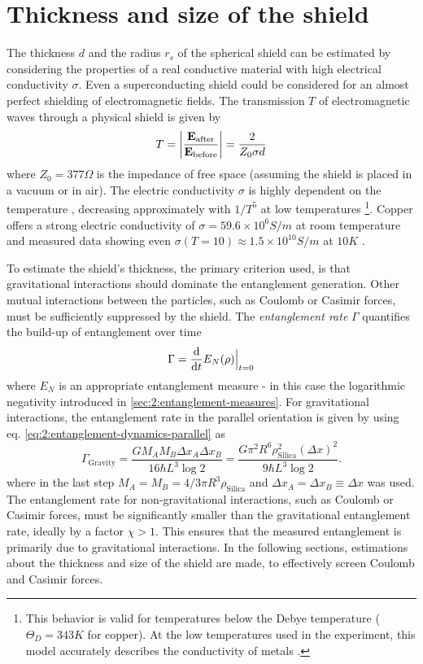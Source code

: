 \section{Thickness and size of the shield}\label{sec:5:shield-size}
The thickness $d$ and the radius $r_s$ of the spherical shield can be estimated by considering the properties of a real conductive material with high electrical conductivity $\sigma$.
Even a superconducting shield could be considered for an almost perfect shielding of electromagnetic fields.
The transmission $T$ of electromagnetic waves through a physical shield is given by \cite{Vandenbosch_2022}
\begin{equation}
  T = \abs{\frac{\vec{E}_\mathrm{after}}{\vec{E}_\mathrm{before}}} = \frac{2}{Z_0 \sigma d}
\end{equation}
where $Z_0 = 377\si{\Omega}$ is the impedance of free space (assuming the shield is placed in a vacuum or in air).
The electric conductivity $\sigma$ is highly dependent on the temperature \cite[p. 284-286]{Gross_2018}, decreasing approximately with $1/T^5$ at low temperatures \footnote{This behavior is valid for temperatures below the Debye temperature ($\Theta_D = 343\si{K}$ for copper). At the low temperatures used in the experiment, this model accurately describes the conductivity of metals \cite{Berman_1952}.}.
Copper offers a strong electric conductivity of $\sigma = 59.6\times 10^6 \si{S/m}$ at room temperature and measured data showing even $\sigma(T = 10) \approx 1.5\times 10^{10}\si{S/m}$ at $10\si{K}$ \cite{Berman_1952}.

To estimate the shield's thickness, the primary criterion used, is that gravitational interactions should dominate the entanglement generation.
Other mutual interactions between the particles, such as Coulomb or Casimir forces, must be sufficiently suppressed by the shield.
The \emph{entanglement rate} $\Gamma$ quantifies the build-up of entanglement over time
\begin{equation}\label{eq:5:entanglement-rate}
  \Gamma = \dv{t} E_N(\rho)\Big|_{t=0}
\end{equation} 
where $E_N$ is an appropriate entanglement measure - in this case the logarithmic negativity \cite{Plenio_2005} introduced in \cref{sec:2:entanglement-measures}.
For gravitational interactions, the entanglement rate in the parallel orientation is given by using eq. \eqref{eq:2:entanglement-dynamics-parallel} as
\begin{equation}\label{eq:5:entanglement-rate-gravity}
  \Gamma_\mathrm{Gravity} = \frac{G M_A M_B \Delta x_A \Delta x_B}{16 \hbar L^3 \log 2} = \frac{G \pi^2 R^6 \rho_\mathrm{Silica}^2 (\Delta x)^2}{9 \hbar L^3 \log 2} .
\end{equation}
where in the last step $M_A = M_B = 4/3 \pi R^3 \rho_\mathrm{Silica}$ and $\Delta x_A = \Delta x_B \equiv \Delta x$ was used.
The entanglement rate for non-gravitational interactions, such as Coulomb or Casimir forces, must be significantly smaller than the gravitational entanglement rate, ideally by a factor $\chi > 1$.
This ensures that the measured entanglement is primarily due to gravitational interactions.
In the following sections, estimations about the thickness and size of the shield are made, to effectively screen Coulomb and Casimir forces.


